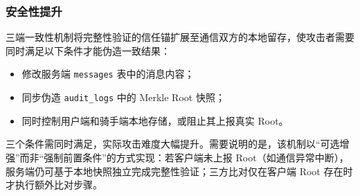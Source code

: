 \subsubsection*{安全性提升}

三端一致性机制将完整性验证的信任锚扩展至通信双方的本地留存，使攻击者需要同时满足以下条件才能伪造一致结果：

\begin{itemize}[leftmargin=2em]
  \item 修改服务端 \texttt{messages} 表中的消息内容；
  \item 同步伪造 \texttt{audit\_logs} 中的 Merkle Root 快照；
  \item 同时控制用户端和骑手端本地存储，或阻止其上报真实 Root。
\end{itemize}

三个条件需同时满足，实际攻击难度大幅提升。需要说明的是，该机制以“可选增强”而非“强制前置条件”的方式实现：若客户端未上报 Root（如通信异常中断），服务端仍可基于本地快照独立完成完整性验证；三方比对仅在客户端 Root 存在时才执行额外比对步骤。
